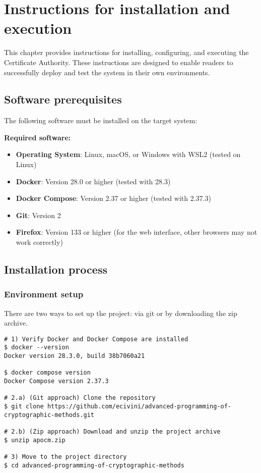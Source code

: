 \chapter{Instructions for installation and execution}

This chapter provides instructions for installing, configuring, and executing the 
Certificate Authority. These instructions are designed to enable readers to successfully 
deploy and test the system in their own environments.

\section{Software prerequisites}

The following software must be installed on the target system:

\textbf{Required software:}
\begin{itemize}
    \item \textbf{Operating System}: Linux, macOS, or Windows with WSL2 (tested on Linux)
    \item \textbf{Docker}: Version 28.0 or higher (tested with 28.3)
    \item \textbf{Docker Compose}: Version 2.37 or higher (tested with 2.37.3)
    \item \textbf{Git}: Version 2
    \item \textbf{Firefox}: Version 133 or higher (for the web interface, other browsers may not work correctly)
\end{itemize}

\section{Installation process}

\subsection{Environment setup}
There are two ways to set up the project: via git or by downloading the zip archive. 
\begin{verbatim}
# 1) Verify Docker and Docker Compose are installed
$ docker --version
Docker version 28.3.0, build 38b7060a21

$ docker compose version
Docker Compose version 2.37.3

# 2.a) (Git approach) Clone the repository 
$ git clone https://github.com/ecivini/advanced-programming-of-cryptographic-methods.git

# 2.b) (Zip approach) Download and unzip the project archive
$ unzip apocm.zip

# 3) Move to the project directory
$ cd advanced-programming-of-cryptographic-methods
\end{verbatim}

